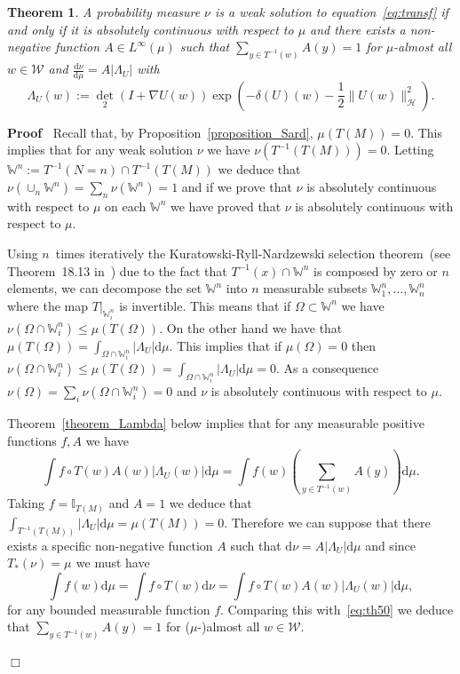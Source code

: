 \documentclass[a4paper,10pt]{article}
\newcommand{\assign}{:=}
\newcommand{\asterisk}{\mathord{*}}
\newcommand{\mathd}{\mathrm{d}}
\newcommand{\nobracket}{}
\newenvironment{proof}{\noindent\textbf{Proof\ }}{\hspace*{\fill}$\Box$\medskip}
\newtheorem{theorem}{Theorem}
\begin{document}
\begin{theorem}
  \label{theorem_weaksolution}A probability measure $\nu$ is a weak solution
  to equation~{\eqref{eq:transf}} if and only if it is absolutely continuous
  with respect to $\mu$ and there exists a non-negative function $A \in
  L^{\infty} (\mu)$ such that $\sum_{y \in T^{- 1} (w)} A (y) = 1$ for
  $\mu$-almost all $w \in \mathcal{W}$ and $\frac{\mathd \nu}{\mathd \mu} = A
  | \Lambda_U |$ with
  \[ \Lambda_U (w) \assign \det_2 (I + \nabla U (w)) \exp \left( - \delta (U)
     (w) - \frac{1}{2} \|U (w) \|_{\mathcal{H}}^2 \right) . \]
\end{theorem}

\begin{proof}
  Recall that, by Proposition~\ref{proposition_Sard}, $\mu (T (M)) = 0$. This
  implies that for any weak solution $\nu$ we have $\nu (T^{- 1} (T (M))) =
  0$. Letting $\mathbb{W}^n \assign T^{- 1} (N = n) \cap T^{- 1} (T (M))$ we
  deduce that $\nu (\cup_n \mathbb{W}^n) = \sum_n \nu (\mathbb{W}^n) = 1$ and
  if we prove that $\nu$ is absolutely continuous with respect to $\mu$ on
  each $\mathbb{W}^n$ we have proved that $\nu$ is absolutely continuous with
  respect to $\mu$.
  
  Using $n$~times iteratively the Kuratowski-Ryll-Nardzewski selection
  theorem~(see Theorem~18.13 in~{\cite{Aliprantis2006}}) due to the fact that
  $T^{- 1} (x) \cap \mathbb{W}^n$ is composed by zero or $n$ elements, we can
  decompose the set $\mathbb{W}^n$ into $n$ measurable subsets
  $\mathbb{W}^n_1, \ldots, \mathbb{W}^n_n$ where the map $\nobracket T
  |_{\mathbb{W}^n_i}$ is invertible. This means that if $\Omega \subset
  \mathbb{W}^n$ we have $\nu (\Omega \cap \mathbb{W}^n_i) \leqslant \mu (T
  (\Omega))$. On the other hand we have that $\mu (T (\Omega)) = \int_{\Omega
  \cap \mathbb{W}^n_i} | \Lambda_U | \mathd \mu$. This implies that if $\mu
  (\Omega) = 0$ then $\nu (\Omega \cap \mathbb{W}^n_i) \leqslant \mu (T
  (\Omega)) = \int_{\Omega \cap \mathbb{W}^n_i} | \Lambda_U | \mathd \mu = 0$.
  As a consequence $\nu (\Omega) = \sum_i \nu (\Omega \cap \mathbb{W}^n_i) =
  0$ and $\nu$ is absolutely continuous with respect to $\mu$.
  
  Theorem~\ref{theorem_Lambda} below implies that for any measurable positive
  functions $f, A$ we have
  \begin{equation}
    \int f \circ T (w) A (w) | \Lambda_U (w) | \mathd \mu = \int f (w) \left(
    \sum_{y \in T^{- 1} (w)} A (y) \right) \mathd \mu . \label{eq:th50}
  \end{equation}
  Taking $f =\mathbb{I}_{T (M)}$ and $A = 1$ we deduce that $\int_{T^{- 1} (T
  (M))} | \Lambda_U | \mathd \mu = \mu (T (M)) = 0$. Therefore we can suppose
  that there exists a specific non-negative function $A$ such that $\mathd \nu
  = A | \Lambda_U | \mathd \mu$ and since $T_{\asterisk} (\nu) = \mu^{}$ we
  must have
  \[ \int f (w) \mathd \mu = \int f \circ T (w) \mathd \nu = \int f \circ T
     (w) A (w) | \Lambda_U (w) | \mathd \mu, \]
  for any bounded measurable function $f$. Comparing this
  with~{\eqref{eq:th50}} we deduce that $\sum_{y \in T^{- 1} (w)} A (y) = 1$
  for ($\mu$-)almost all $w \in \mathcal{W}.$
  

\end{proof}
\end{document}
